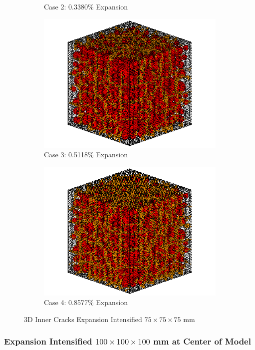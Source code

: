 \begin{figure}[!h]
\begin{subfigure}{.5\textwidth}
    \caption{Case 2: 0.3380\% Expansion}
    \end{subfigure}%
    \begin{subfigure}{.5\textwidth}
      \centering
      \includegraphics[width=.8\linewidth]{Files/exp_3D/DEF/A30X-5C_3_c.png}
    \caption{Case 3: 0.5118\% Expansion}
    \end{subfigure}
    \begin{subfigure}{.5\textwidth}
      \centering
      \includegraphics[width=.8\linewidth]{Files/exp_3D/DEF/A30X-5C_4_c.png}
    \caption{Case 4: 0.8577\% Expansion}
    \end{subfigure}%

  \caption{3D Inner Cracks Expansion Intensified $75 \times 75 \times 75$ mm}
  \label{fig:DEF_A30X-5C_3Dasdasd}
\end{figure}


\clearpage
\subsubsection{Expansion Intensified $100 \times 100 \times 100$ mm at Center of Model}

